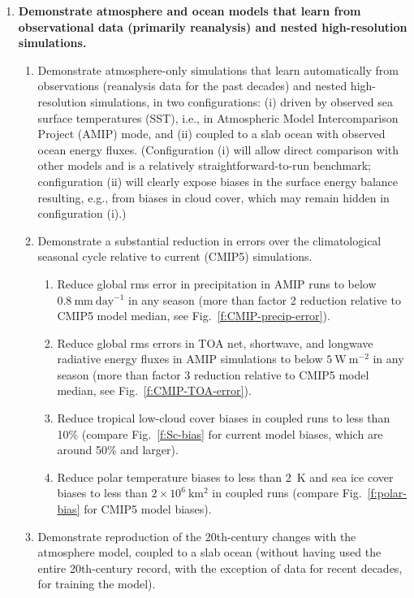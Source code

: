 \documentclass{article}
\begin{document}
\begin{enumerate}
    \item \textbf{Demonstrate atmosphere and ocean models that learn from observational data (primarily reanalysis) and nested high-resolution simulations.}
    \begin{enumerate}
        \item Demonstrate atmosphere-only simulations that learn automatically from observations (reanalysis data for the past decades) and nested high-resolution simulations, in two configurations: (i) driven by observed sea surface temperatures (SST), i.e., in Atmospheric Model Intercomparison Project (AMIP) mode, and (ii) coupled to a slab ocean with observed ocean energy fluxes. (Configuration (i) will allow direct comparison with other models and is a relatively straightforward-to-run benchmark; configuration (ii) will clearly expose biases in the surface energy balance resulting, e.g., from biases in cloud cover, which may remain hidden in configuration (i).)
        \item Demonstrate a substantial reduction in errors over the climatological seasonal cycle relative to current (CMIP5) simulations. 
        \begin{enumerate}
            \item Reduce global rms error in precipitation in AMIP runs to below $0.8~\mathrm{mm~day^{-1}}$ in any season (more than factor 2 reduction relative to CMIP5 model median, see Fig.~\ref{f:CMIP-precip-error}).
            \item Reduce global rms errors in TOA net, shortwave, and longwave radiative energy fluxes in AMIP simulations to below $5~\mathrm{W~m^{-2}}$ in any season (more than factor 3 reduction relative to CMIP5 model median, see Fig.~\ref{f:CMIP-TOA-error}).
            \item Reduce tropical low-cloud cover biases in coupled runs to less than 10\% (compare Fig.~\ref{f:Sc-bias} for current model biases, which are around 50\% and larger).
            \item Reduce polar temperature biases to less than 2~K and sea ice cover biases to less than $2\times 10^6~\mathrm{km^2}$ in coupled runs (compare Fig.~\ref{f:polar-bias} for CMIP5 model biases).
             \end{enumerate}
                \item Demonstrate reproduction of the 20th-century changes with the atmosphere model, coupled to a slab ocean (without having used the entire 20th-century record, with the exception of data for recent decades, for training the model).

\end{enumerate}
\end{enumerate}
\end{document}

